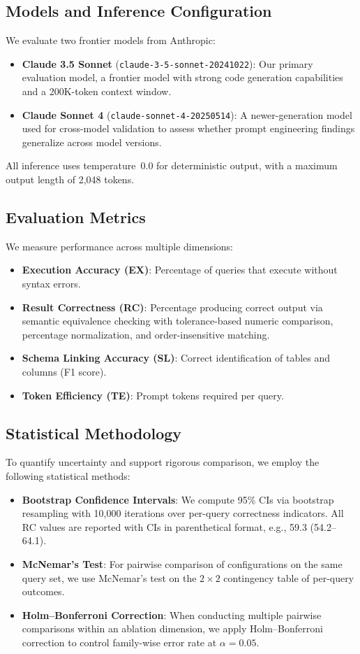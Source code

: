 \documentclass[sigconf, nonacm]{acmart}
\begin{document}
\subsection{Models and Inference Configuration}
We evaluate two frontier models from Anthropic:
\begin{itemize}
    \item \textbf{Claude 3.5 Sonnet} (\texttt{claude-3-5-sonnet-20241022}): Our primary evaluation model, a frontier model with strong code generation capabilities and a 200K-token context window.
    \item \textbf{Claude Sonnet 4} (\texttt{claude-sonnet-4-20250514}): A newer-generation model used for cross-model validation to assess whether prompt engineering findings generalize across model versions.
\end{itemize}
All inference uses temperature~0.0 for deterministic output, with a maximum output length of 2,048 tokens.

\subsection{Evaluation Metrics}
We measure performance across multiple dimensions:
\begin{itemize}
    \item \textbf{Execution Accuracy (EX)}: Percentage of queries that execute without syntax errors.
    \item \textbf{Result Correctness (RC)}: Percentage producing correct output via semantic equivalence checking with tolerance-based numeric comparison, percentage normalization, and order-insensitive matching.
    \item \textbf{Schema Linking Accuracy (SL)}: Correct identification of tables and columns (F1 score).
    \item \textbf{Token Efficiency (TE)}: Prompt tokens required per query.
\end{itemize}

\subsection{Statistical Methodology}
To quantify uncertainty and support rigorous comparison, we employ the following statistical methods:
\begin{itemize}
    \item \textbf{Bootstrap Confidence Intervals}: We compute 95\% CIs via bootstrap resampling with 10{,}000 iterations over per-query correctness indicators. All RC values are reported with CIs in parenthetical format, e.g., 59.3 (54.2--64.1).
    \item \textbf{McNemar's Test}: For pairwise comparison of configurations on the same query set, we use McNemar's test on the $2 \times 2$ contingency table of per-query outcomes.
    \item \textbf{Holm--Bonferroni Correction}: When conducting multiple pairwise comparisons within an ablation dimension, we apply Holm--Bonferroni correction to control family-wise error rate at $\alpha = 0.05$.
\end{itemize}
\end{document}
